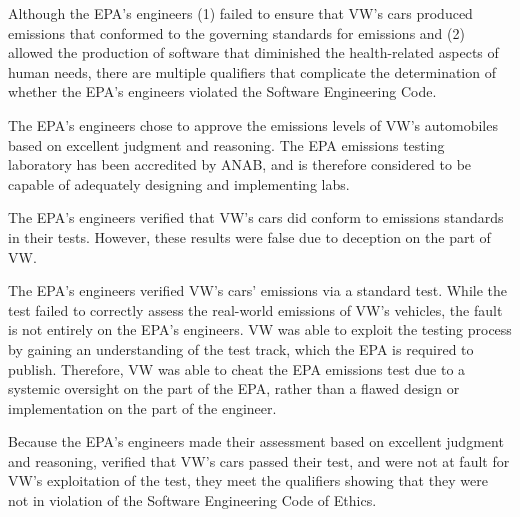Although the EPA's engineers (1) failed to ensure that VW's cars produced emissions that conformed to the governing standards for emissions and (2) allowed the production of software that diminished the health-related aspects of human needs, there are multiple qualifiers that complicate the determination of whether the EPA's engineers violated the Software Engineering Code.

The EPA's engineers chose to approve the emissions levels of VW's automobiles based on excellent judgment and reasoning. The EPA emissions testing laboratory has been accredited\cite{anab_accreditation} by ANAB\cite{anab_recognition}, and is therefore considered to be capable of adequately designing and implementing labs.

The EPA's engineers verified that VW's cars did conform to emissions standards in their tests\cite{study}. However, these results were false due to deception on the part of VW\cite{course_detection}. 

The EPA's engineers verified VW's cars' emissions via a standard test\cite{epa_track}. While the test failed to correctly assess the real-world emissions of VW's vehicles, the fault is not entirely on the EPA's engineers. VW was able to exploit the testing process by gaining an understanding of the test track, which the EPA is required to publish\cite{epa_track_details}. Therefore, VW was able to cheat the EPA emissions test due to a systemic oversight on the part of the EPA, rather than a flawed design or implementation on the part of the engineer.

Because the EPA's engineers made their assessment based on excellent judgment and reasoning, verified that VW's cars passed their test, and were not at fault for VW's exploitation of the test, they meet the qualifiers showing that they were not in violation of the Software Engineering Code of Ethics.